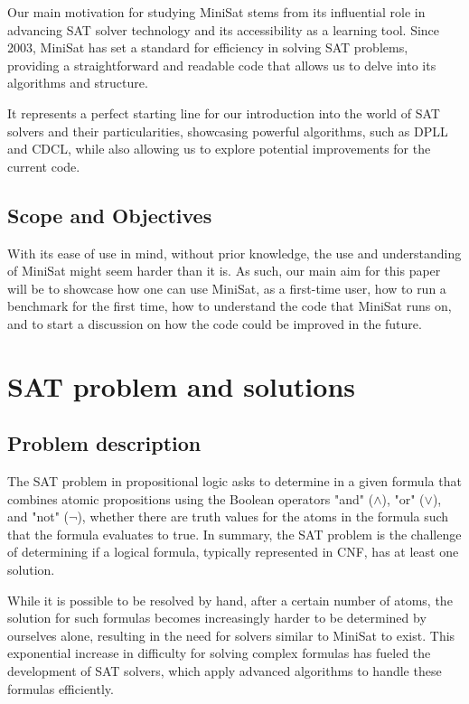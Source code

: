 \documentclass[runningheads]{llncs}
\begin{document}
Our main motivation for studying MiniSat stems from its influential role in advancing \ac{SAT} solver technology and its accessibility as a learning tool. Since 2003, MiniSat has set a standard for efficiency in solving \ac{SAT} problems, providing a straightforward and readable code that allows us to delve into its algorithms and structure. 

It represents a perfect starting line for our introduction into the world of \ac{SAT} solvers and their particularities, showcasing powerful algorithms, such as \ac{DPLL} and \ac{CDCL}, while also allowing us to explore potential improvements for the current code.

\subsection{Scope and Objectives}\label{sect:Scope and Objectives}

With its ease of use in mind, without prior knowledge, the use and understanding of MiniSat might seem harder than it is. As such, our main aim for this paper will be to showcase how one can use MiniSat, as a first-time user, how to run a benchmark for the first time, how to understand the code that MiniSat runs on, and to start a discussion on how the code could be improved in the future.

\newpage

\section{SAT problem and solutions}\label{cap:SAT problem and solutions}
\subsection{Problem description}\label{sect:Problem Description}

The \ac{SAT} problem in propositional logic asks to determine in a given formula that combines atomic propositions using the Boolean operators "and" ($\land$), "or" ($\lor$), and "not" ($\neg$), whether there are truth values for the atoms in the formula such that the formula evaluates to true\cite{SAT}. In summary, the \ac{SAT} problem is the challenge of determining if a logical formula, typically represented in \ac{CNF}, has at least one solution.

While it is possible to be resolved by hand, after a certain number of atoms, the solution for such formulas becomes increasingly harder to be determined by ourselves alone, resulting in the need for solvers similar to MiniSat to exist. This exponential increase in difficulty for solving complex formulas has fueled the development of \ac{SAT} solvers, which apply advanced algorithms to handle these formulas efficiently.
\end{document}
